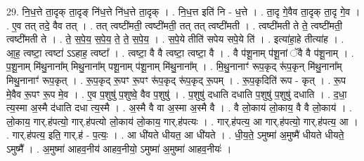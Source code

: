 \documentclass[17pt]{extarticle}
\begin{document}
29. नि॒ध॒त्ते ता॒दृक् ता॒दृङ् नि॑ध॒त्ते नि॑ध॒त्ते ता॒दृक् । . नि॒ध॒त्त इति॑ नि - ध॒त्ते । . ता॒दृ गे॒वैव ता॒दृक् ता॒दृ गे॒व । . ए॒व तत् तदे॒ वैव तत् । . तत् त्वष्टी॑मती॒ त्वष्टी॑मती॒ तत् तत् त्वष्टी॑मती । . त्वष्टी॑मती ते ते॒ त्वष्टी॑मती॒ त्वष्टी॑मती ते । . ते॒ स॒पे॒य॒ स॒पे॒य॒ ते॒ ते॒ स॒पे॒य॒ । . स॒पे॒ये तीति॑ सपेय सपे॒ये ति॑ । . इत्या॑हा॒हे तीत्या॑ह । . आ॒ह॒ त्वष्टा॒ त्वष्टा॑ ऽऽहाह॒ त्वष्टा᳚ । . त्वष्टा॒ वै वै त्वष्टा॒ त्वष्टा॒ वै । . वै प॑शू॒नाम् प॑शू॒नां ॅवै वै प॑शू॒नाम् । . प॒शू॒नाम् मि॑थु॒नाना᳚म् मिथु॒नाना᳚म् पशू॒नाम् प॑शू॒नाम् मि॑थु॒नाना᳚म् । . मि॒थु॒नानाꣳ॑ रूप॒कृद् रू॑प॒कृन् मि॑थु॒नाना᳚म् मिथु॒नानाꣳ॑ रूप॒कृत् । . रू॒प॒कृद् रू॒पꣳ रू॒पꣳ रू॑प॒कृद् रू॑प॒कृद् रू॒पम् । . रू॒प॒कृदिति॑ रूप - कृत् । . रू॒प मे॒वैव रू॒पꣳ रू॒प मे॒व । . ए॒व प॒शुषु॑ प॒शुष्वे॒ वैव प॒शुषु॑ । . प॒शुषु॑ दधाति दधाति प॒शुषु॑ प॒शुषु॑ दधाति । . द॒धा॒ त्य॒स्मा अ॒स्मै द॑धाति दधा त्य॒स्मै । . अ॒स्मै वै वा अ॒स्मा अ॒स्मै वै । . वै लो॒काय॑ लो॒काय॒ वै वै लो॒काय॑ । . लो॒काय॒ गार्.ह॑पत्यो॒ गार्.ह॑पत्यो लो॒काय॑ लो॒काय॒ गार्.ह॑पत्यः । . गार्.ह॑पत्य॒ आ गार्.ह॑पत्यो॒ गार्.ह॑पत्य॒ आ । . गार्.ह॑पत्य॒ इति॒ गार्.ह॑ - प॒त्यः॒ । . आ धी॑यते धीयत॒ आ धी॑यते । . धी॒य॒ते॒ ऽमुष्मा॑ अ॒मुष्मै॑ धीयते धीयते॒ ऽमुष्मै᳚ । . अ॒मुष्मा॑ आहव॒नीय॑ आहव॒नीयो॒ ऽमुष्मा॑ अ॒मुष्मा॑ आहव॒नीयः॑ । \newline
\end{document}
